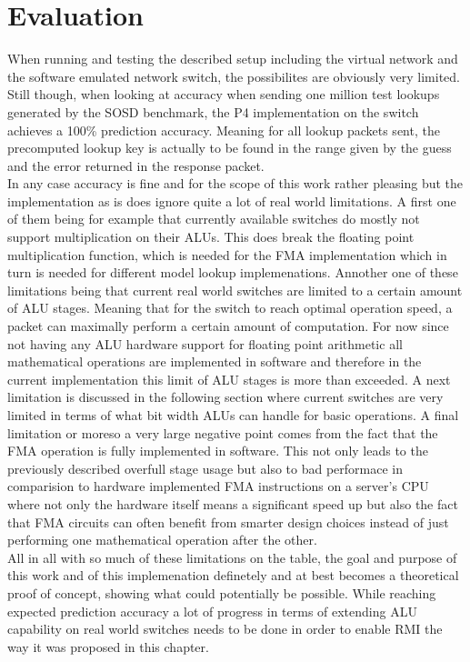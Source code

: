 \section{Evaluation}
\label{sect:rmionbmv2:evaluation}
When running and testing the described setup including the virtual network and the software emulated network switch, the possibilites are obviously very limited. Still though, when looking at accuracy when sending one million test lookups generated by the SOSD benchmark, the P4 implementation on the switch achieves a 100\% prediction accuracy. Meaning for all lookup packets sent, the precomputed lookup key is actually to be found in the range given by the guess and the error returned in the response packet.\\

In any case accuracy is fine and for the scope of this work rather pleasing but the implementation as is does ignore quite a lot of real world limitations. A first one of them being for example that currently available switches do mostly not support multiplication on their ALUs. This does break the floating point multiplication function, which is needed for the FMA implementation which in turn is needed for different model lookup implemenations. Annother one of these limitations being that current real world switches are limited to a certain amount of ALU stages. Meaning that for the switch to reach optimal operation speed, a packet can maximally perform a certain amount of computation. For now since not having any ALU hardware support for floating point arithmetic all mathematical operations are implemented in software and therefore in the current implementation this limit of ALU stages is more than exceeded. A next limitation is discussed in the following section where current switches are very limited in terms of what bit width ALUs can handle for basic operations. A final limitation or moreso a very large negative point comes from the fact that the FMA operation is fully implemented in software. This not only leads to the previously described overfull stage usage but also to bad performace in comparision to hardware implemented FMA instructions on a server's CPU where not only the hardware itself means a significant speed up but also the fact that FMA circuits can often benefit from smarter design choices instead of just performing one mathematical operation after the other.\\

All in all with so much of these limitations on the table, the goal and purpose of this work and of this implemenation definetely and at best becomes a theoretical proof of concept, showing what could potentially be possible. While reaching expected prediction accuracy a lot of progress in terms of extending ALU capability on real world switches needs to be done in order to enable RMI the way it was proposed in this chapter.

